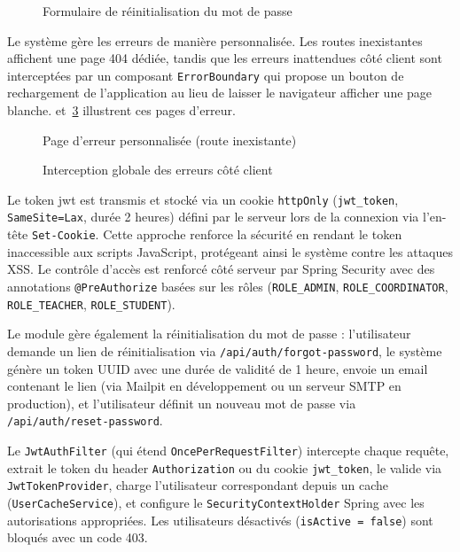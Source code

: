 \begin{figure}[H]
    \centering
    \caption{Formulaire de réinitialisation du mot de passe}
    \label{fig:forgot-password}
\end{figure}

Le système gère les erreurs de manière personnalisée. Les routes inexistantes affichent une page 404 dédiée, tandis que les erreurs inattendues côté client sont interceptées par un composant \texttt{ErrorBoundary} qui propose un bouton de rechargement de l'application au lieu de laisser le navigateur afficher une page blanche.  et~\cref{fig:error-boundary} illustrent ces pages d'erreur.

\begin{figure}[H]
    \centering
    \caption{Page d'erreur personnalisée (route inexistante)}
    \label{fig:error-404}
\end{figure}

\begin{figure}[H]
    \centering
    \caption{Interception globale des erreurs côté client}
    \label{fig:error-boundary}
\end{figure}

Le token \acrshort{jwt} est transmis et stocké via un cookie \texttt{httpOnly} (\texttt{jwt\_token}, \texttt{SameSite=Lax}, durée 2 heures) défini par le serveur lors de la connexion via l'en-tête \texttt{Set-Cookie}. Cette approche renforce la sécurité en rendant le token inaccessible aux scripts JavaScript, protégeant ainsi le système contre les attaques XSS. Le contrôle d'accès est renforcé côté serveur par Spring Security avec des annotations \texttt{@PreAuthorize} basées sur les rôles (\texttt{ROLE\_ADMIN}, \texttt{ROLE\_COORDINATOR}, \texttt{ROLE\_TEACHER}, \texttt{ROLE\_STUDENT}).

Le module gère également la réinitialisation du mot de passe : l'utilisateur demande un lien de réinitialisation via \texttt{/api/auth/forgot-password}, le système génère un token UUID avec une durée de validité de 1 heure, envoie un email contenant le lien (via Mailpit en développement ou un serveur SMTP en production), et l'utilisateur définit un nouveau mot de passe via \texttt{/api/auth/reset-password}.

Le \texttt{JwtAuthFilter} (qui étend \texttt{OncePerRequestFilter}) intercepte chaque requête, extrait le token du header \texttt{Authorization} ou du cookie \texttt{jwt\_token}, le valide via \texttt{JwtTokenProvider}, charge l'utilisateur correspondant depuis un cache (\texttt{UserCacheService}), et configure le \texttt{SecurityContextHolder} Spring avec les autorisations appropriées. Les utilisateurs désactivés (\texttt{isActive = false}) sont bloqués avec un code 403.

